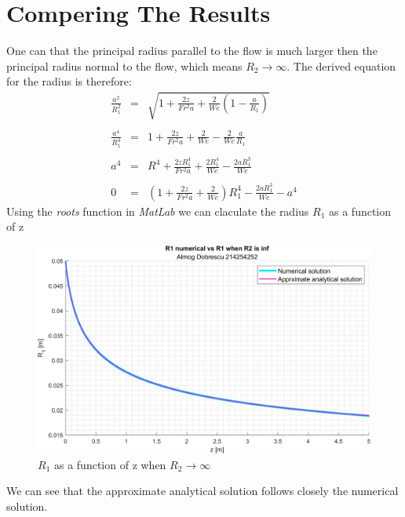 \documentclass[11pt, a4paper]{article}
\begin{document}
\section{Compering The Results}
One can that the principal radius parallel to the flow is much larger then the principal radius normal to the flow, which means $R_2\rightarrow\infty$. The derived equation for the radius is therefore:
\begin{equation}
    \begin{array}{rcl}
        \displaystyle\frac{a^2}{R_1^2}&=&\displaystyle\sqrt{1+\frac{2z}{Fr^2a}+\frac{2}{We}\left(1-\frac{a}{R_1}\right)} \\\\
        \displaystyle\frac{a^4}{R_1^4}&=&\displaystyle1+\frac{2z}{Fr^2a}+\frac{2}{We}-\frac{2}{We}\frac{a}{R_1} \\\\
        a^4&=&\displaystyle R^4+\frac{2zR_1^4}{Fr^2a}+\frac{2R_1^4}{We}-\frac{2aR_1^3}{We} \\\\
        0&=&\displaystyle\left(1+\frac{2z}{Fr^2a}+\frac{2}{We}\right)R_1^4-\frac{2aR_1^3}{We}-a^4
    \end{array}
\end{equation}
Using the \emph{roots} function in \emph{MatLab} we can claculate the radius $R_1$ as a function of z
\begin{figure}[H]
    \centering
    \includegraphics[width=1\textwidth]{images/graph3.png}
    \caption{$R_1$ as a function of z when $R_2\rightarrow\infty$}
    \label{fig:R_1_of_z_when_R_2_inf}
\end{figure}
We can see that the approximate analytical solution follows closely the numerical solution. \\
\end{document}
